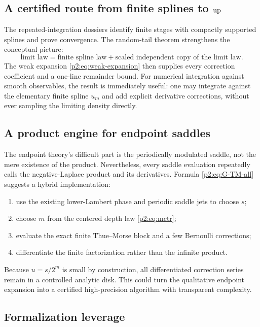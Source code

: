 \documentclass[11pt,oneside]{article}
\numberwithin{equation}{section}
\theoremstyle{definition}
\theoremstyle{remark}
\begin{document}
\subsection{A certified route from finite splines to $\operatorname{up}$}

The repeated-integration dossiers identify finite stages with compactly supported splines and
prove convergence.  The random-tail theorem strengthens the conceptual picture:
\[
 \text{limit law} = \text{finite spline law} + \text{scaled independent copy of the limit law}.
\]
The weak expansion \eqref{p2:eq:weak-expansion} then supplies every correction coefficient and a
one-line remainder bound.  For numerical integration against smooth observables, the result
is immediately useful: one may integrate against the elementary finite spline $u_m$ and add
explicit derivative corrections, without ever sampling the limiting density directly.

\subsection{A product engine for endpoint saddles}

The endpoint theory's difficult part is the periodically modulated saddle, not the mere
existence of the product.  Nevertheless, every saddle evaluation repeatedly calls the
negative-Laplace product and its derivatives.  Formula \eqref{p2:eq:G-TM-all} suggests a hybrid
implementation:
\begin{enumerate}
\item use the existing lower-Lambert phase and periodic saddle jets to choose $s$;
\item choose $m$ from the centered depth law \eqref{p2:eq:mctr};
\item evaluate the exact finite Thue--Morse block and a few Bernoulli corrections;
\item differentiate the finite factorization rather than the infinite product.
\end{enumerate}
Because $u=s/2^m$ is small by construction, all differentiated correction series remain in a
controlled analytic disk.  This could turn the qualitative endpoint expansion into a
certified high-precision algorithm with transparent complexity.

\subsection{Formalization leverage}
\end{document}
